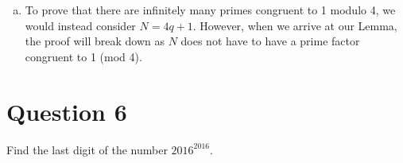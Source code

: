 \documentclass[11pt, oneside]{article}   	%
\begin{document}
\begin{enumerate}[(a)]

	
	\item To prove that there are infinitely many primes congruent to 1 modulo 4, we would instead consider $N = 4q + 1$. However, when we arrive at our Lemma, the proof will break down as $N$ does not have to have a prime factor congruent to 1 (mod 4).
	
	
\end{enumerate}

\section*{Question 6}

Find the last digit of the number $2016^{2016}$.
\end{document}
